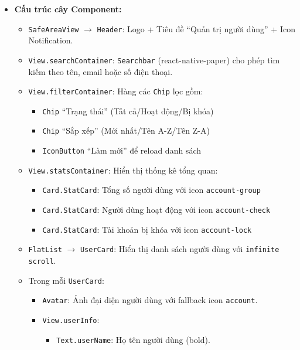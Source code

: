 \begin{itemize}
    \item \textbf{Cấu trúc cây Component:}
        \begin{itemize}
            \item \texttt{SafeAreaView} $\rightarrow$ \texttt{Header}: Logo + Tiêu đề ``Quản trị người dùng'' + Icon Notification.
            \item \texttt{View.searchContainer}: \texttt{Searchbar} (react-native-paper) cho phép tìm kiếm theo tên, email hoặc số điện thoại.
            \item \texttt{View.filterContainer}: Hàng các \texttt{Chip} lọc gồm:
                \begin{itemize}
                    \item \texttt{Chip} ``Trạng thái'' (Tất cả/Hoạt động/Bị khóa)
                    \item \texttt{Chip} ``Sắp xếp'' (Mới nhất/Tên A-Z/Tên Z-A)
                    \item \texttt{IconButton} ``Làm mới'' để reload danh sách
                \end{itemize}
            \item \texttt{View.statsContainer}: Hiển thị thống kê tổng quan:
                \begin{itemize}
                    \item \texttt{Card.StatCard}: Tổng số người dùng với icon \texttt{account-group}
                    \item \texttt{Card.StatCard}: Người dùng hoạt động với icon \texttt{account-check}
                    \item \texttt{Card.StatCard}: Tài khoản bị khóa với icon \texttt{account-lock}
                \end{itemize}
            \item \texttt{FlatList} $\rightarrow$ \texttt{UserCard}: Hiển thị danh sách người dùng với \texttt{infinite scroll}.
            \item Trong mỗi \texttt{UserCard}:
                \begin{itemize}
                    \item \texttt{Avatar}: Ảnh đại diện người dùng với fallback icon \texttt{account}.
                    \item \texttt{View.userInfo}:
                        \begin{itemize}
                            \item \texttt{Text.userName}: Họ tên người dùng (bold).

\end{itemize}
\end{itemize}
\end{itemize}
\end{itemize}
